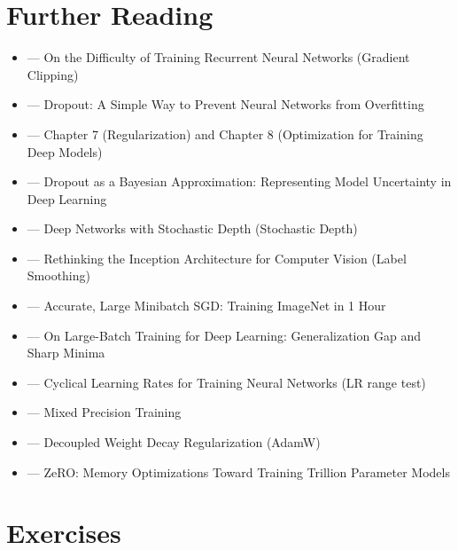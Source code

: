 \section{Further Reading}

\begin{itemize}
    \item \cite{pascanu2013difficulty} --- On the Difficulty of Training Recurrent Neural Networks (Gradient Clipping)
    \item \cite{srivastava2014dropout} --- Dropout: A Simple Way to Prevent Neural Networks from Overfitting
    \item \cite{goodfellow2016deep} --- Chapter 7 (Regularization) and Chapter 8 (Optimization for Training Deep Models)
    \item \cite{gal2016dropout} --- Dropout as a Bayesian Approximation: Representing Model Uncertainty in Deep Learning
    \item \cite{huang2016deep} --- Deep Networks with Stochastic Depth (Stochastic Depth)
    \item \cite{szegedy2016rethinking} --- Rethinking the Inception Architecture for Computer Vision (Label Smoothing)
    \item \cite{goyal2017accurate} --- Accurate, Large Minibatch SGD: Training ImageNet in 1 Hour
    \item \cite{keskar2017largebatch} --- On Large-Batch Training for Deep Learning: Generalization Gap and Sharp Minima
    \item \cite{smith2017cyclical} --- Cyclical Learning Rates for Training Neural Networks (LR range test)
    \item \cite{micikevicius2018mixed} --- Mixed Precision Training
    \item \cite{loshchilov2019decoupled} --- Decoupled Weight Decay Regularization (AdamW)
    \item \cite{rajbhandari2020zero} --- ZeRO: Memory Optimizations Toward Training Trillion Parameter Models
\end{itemize}

\section{Exercises}

